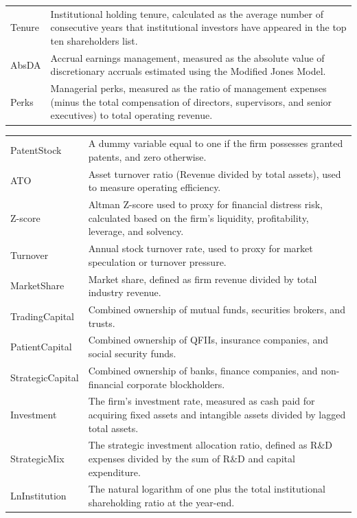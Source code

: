 \begin{table}[htbp]
\begin{tabular}{p{2.0cm}p{13.5cm}}
Tenure   & Institutional holding tenure, calculated as the average number of consecutive years that institutional investors have appeared in the top ten shareholders list. \\
AbsDA   & Accrual earnings management, measured as the absolute value of discretionary accruals estimated using the Modified Jones Model. \\
Perks   & Managerial perks, measured as the ratio of management expenses (minus the total compensation of directors, supervisors, and senior executives) to total operating revenue. \\
\bottomrule
\end{tabular}
\end{table}

\begin{table}[htbp]\centering\scriptsize
\def\sym#1{\ifmmode^{#1}\else\(^{#1}\)\fi}
\begin{tabular}{p{2.0cm} p{13cm}}
\toprule
PatentStock   & A dummy variable equal to one if the firm possesses granted patents, and zero otherwise. \\
ATO   & Asset turnover ratio (Revenue divided by total assets), used to measure operating efficiency. \\
Z-score   & Altman Z-score used to proxy for financial distress risk, calculated based on the firm's liquidity, profitability, leverage, and solvency. \\
Turnover   & Annual stock turnover rate, used to proxy for market speculation or turnover pressure. \\
MarketShare   & Market share, defined as firm revenue divided by total industry revenue. \\
TradingCapital   & Combined ownership of mutual funds, securities brokers, and trusts. \\
PatientCapital   & Combined ownership of QFIIs, insurance companies, and social security funds. \\
StrategicCapital   & Combined ownership of banks, finance companies, and non-financial corporate blockholders. \\
Investment   & The firm's investment rate, measured as cash paid for acquiring fixed assets and intangible assets divided by lagged total assets. \\
StrategicMix   & The strategic investment allocation ratio, defined as R\&D expenses divided by the sum of R\&D and capital expenditure. \\
LnInstitution   & The natural logarithm of one plus the total institutional shareholding ratio at the year-end. \\

\end{tabular}
\end{table}
